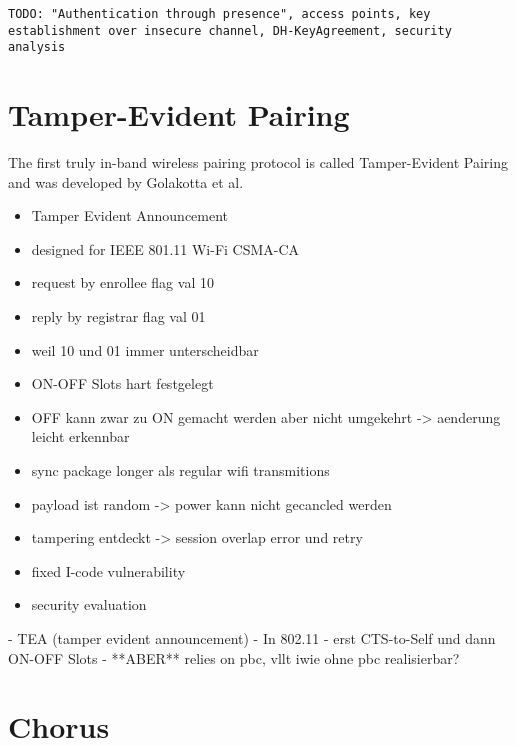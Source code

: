 \documentclass[conference]{IEEEtran}
\begin{document}
\texttt{TODO: "Authentication through presence", access points, key establishment over insecure channel, DH-KeyAgreement, security analysis}

\section{Tamper-Evident Pairing}

The first truly in-band wireless pairing protocol is called Tamper-Evident Pairing and was developed by Golakotta et al.
\begin{itemize}
    \item Tamper Evident Announcement
      \item designed for IEEE 801.11 Wi-Fi CSMA-CA
      \item request by enrollee flag val 10
      \item reply by registrar flag val 01
      \item weil 10 und 01 immer unterscheidbar
      \item ON-OFF Slots hart festgelegt
      \item OFF kann zwar zu ON gemacht werden aber nicht umgekehrt -> aenderung leicht erkennbar
      \item sync package longer als regular wifi transmitions 
      \item payload ist random -> power kann nicht gecancled werden 
      \item tampering entdeckt -> session overlap error und retry
      \item fixed I-code vulnerability
      
    \item security evaluation 
    \end{itemize}

  - TEA (tamper evident announcement)
  - In 802.11
      - erst CTS-to-Self und dann ON-OFF Slots
  - **ABER** relies on pbc, vllt iwie ohne pbc realisierbar?


\section{Chorus}
\end{document}
